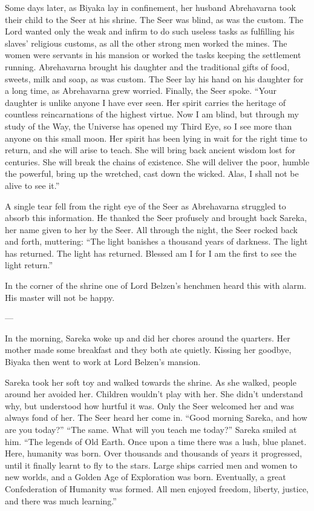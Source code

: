 Some days later, as Biyaka lay in confinement, her husband Abrehavarna took their child to the Seer at his shrine. The Seer was blind, as was the custom. The Lord wanted only the weak and infirm to do such useless tasks as fulfilling his slaves’ religious customs, as all the other strong men worked the mines. The women were servants in his mansion or worked the tasks keeping the settlement running. Abrehavarna brought his daughter and the traditional gifts of food, sweets, milk and soap, as was custom. The Seer lay his hand on his daughter for a long time, as Abrehavarna grew worried. Finally, the Seer spoke. “Your daughter is unlike anyone I have ever seen. Her spirit carries the heritage of countless reincarnations of the highest virtue. Now I am blind, but through my study of the Way, the Universe has opened my Third Eye, so I see more than anyone on this small moon. Her spirit has been lying in wait for the right time to return, and she will arise to teach. She will bring back ancient wisdom lost for centuries. She will break the chains of existence. She will deliver the poor, humble the powerful, bring up the wretched, cast down the wicked. Alas, I shall not be alive to see it.”

A single tear fell from the right eye of the Seer as Abrehavarna struggled to absorb this information. He thanked the Seer profusely and brought back Sareka, her name given to her by the Seer. All through the night, the Seer rocked back and forth, muttering: “The light banishes a thousand years of darkness. The light has returned. The light has returned. Blessed am I for I am the first to see the light return.”

In the corner of the shrine one of Lord Belzen’s henchmen heard this with alarm. His master will not be happy.

---

In the morning, Sareka woke up and did her chores around the quarters. Her mother made some breakfast and they both ate quietly. Kissing her goodbye, Biyaka then went to work at Lord Belzen’s mansion.

Sareka took her soft toy and walked towards the shrine. As she walked, people around her avoided her. Children wouldn’t play with her. She didn’t understand why, but understood how hurtful it was. Only the Seer welcomed her and was always fond of her. The Seer heard her come in. “Good morning Sareka, and how are you today?” “The same. What will you teach me today?” Sareka smiled at him. “The legends of Old Earth. Once upon a time there was a lush, blue planet. Here, humanity was born. Over thousands and thousands of years it progressed, until it finally learnt to fly to the stars. Large ships carried men and women to new worlds, and a Golden Age of Exploration was born. Eventually, a great Confederation of Humanity was formed. All men enjoyed freedom, liberty, justice, and there was much learning.”

